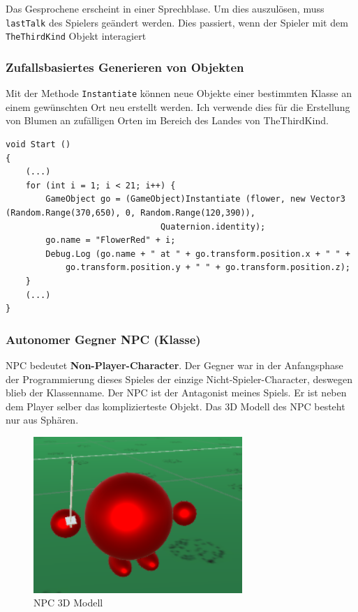 Das Gesprochene erscheint in einer Sprechblase. Um dies auszulösen, muss \lstinline{lastTalk} des Spielers geändert werden.
Dies passiert, wenn der Spieler mit dem \lstinline{TheThirdKind} Objekt interagiert 

\subsubsection{Zufallsbasiertes Generieren von Objekten}

Mit der Methode \lstinline{Instantiate} können neue Objekte einer bestimmten Klasse an einem gewünschten Ort neu erstellt werden. Ich verwende dies für die Erstellung von Blumen an zufälligen Orten im Bereich des Landes von TheThirdKind.
\begin{lstlisting}[caption={Generieren von Blumen beim Start (Player.cs)}]
void Start ()
{
	(...)
	for (int i = 1; i < 21; i++) {
		GameObject go = (GameObject)Instantiate (flower, new Vector3 (Random.Range(370,650), 0, Random.Range(120,390)),
				               Quaternion.identity);
		go.name = "FlowerRed" + i;
		Debug.Log (go.name + " at " + go.transform.position.x + " " +
			go.transform.position.y + " " + go.transform.position.z);
	}
	(...)
}
\end{lstlisting}

\subsubsection{Autonomer Gegner NPC (Klasse)}
\label{subsubsec:npc}
NPC bedeutet \textbf{Non-Player-Character}. Der Gegner war in der Anfangsphase der Programmierung dieses Spieles der einzige Nicht-Spieler-Character, deswegen blieb der Klassenname. Der NPC ist der Antagonist meines Spiels.
Er ist neben dem Player selber das komplizierteste Objekt. Das 3D Modell des NPC besteht nur aus Sphären.

\begin{figure}[H]
\includegraphics[scale=1]{screenshots/npc.png}
\caption{NPC 3D Modell}
\end{figure}

